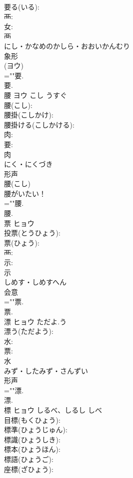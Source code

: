 \documentclass[8pt]{extreport}
\begin{document}
\begin{CJK}{UTF8}{min}
\\	要る(いる): 
\\	襾: 
\\	女: 
\\	襾	
\\	にし・かなめのかしら・おおいかんむり	
\\	象形 
\\	(ヨウ) 
\\	=""要.
\\	要.
\\	腰	ヨウ	こし	うすぐ	
\\	腰(こし): 
\\	腰掛(こしかけ): 
\\	腰掛ける(こしかける): 
\\	肉: 
\\	要: 
\\	肉	
\\	にく・にくづき	
\\	形声 
\\	腰(こし) 
\\	腰がいたい！
\\	=""腰.
\\	腰.
\\	票	ヒョウ			
\\	投票(とうひょう): 
\\	票(ひょう): 
\\	襾: 
\\	示: 
\\	示	
\\	しめす・しめすへん	
\\	会意 
\\	=""票.
\\	票.
\\	漂	ヒョウ	ただよ.う		
\\	漂う(ただよう): 
\\	水: 
\\	票: 
\\	水	
\\	みず・したみず・さんずい	
\\	形声 
\\	=""漂.
\\	漂.
\\	標	ヒョウ	しるべ、しるし	しべ	
\\	目標(もくひょう): 
\\	標準(ひょうじゅん): 
\\	標識(ひょうしき): 
\\	標本(ひょうほん): 
\\	標語(ひょうご): 
\\	座標(ざひょう): 

\end{CJK}
\end{document}
